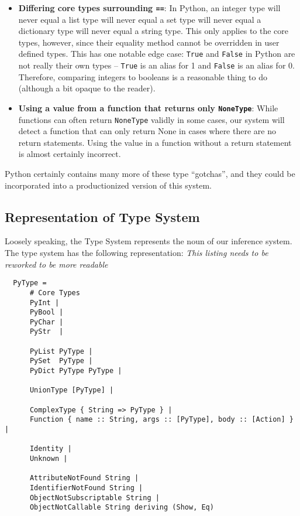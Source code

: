 \documentclass{article}[12pt]
\begin{document}
\begin{itemize}
    \item \textbf{Differing core types surrounding \texttt{==}}: In Python, an integer type will never
          equal a list type will never equal a set type will never equal a dictionary type will
          never equal a string type. This only applies to the core types, however, since their
          equality method cannot be overridden in user defined types. This has one notable edge case: \texttt{True} and
          \texttt{False} in
          Python are not really their own types -- \texttt{True} is an alias for 1 and
          \texttt{False} is an alias for 0. Therefore, comparing integers to booleans is a
          reasonable thing to do (although a bit opaque to the reader).

      \item \textbf{Using a value from a function that returns only \texttt{NoneType}}: While functions can often
          return \texttt{NoneType} validly in some cases, our system will detect a function that can only
          return None in cases where there are no return statements. Using the value in a function
          without a return statement is almost certainly incorrect.
\end{itemize}

Python certainly contains many more of these type ``gotchas'', and they could be incorporated into a
productionized version of this system.

\subsection{Representation of Type System} 

Loosely speaking, the Type System represents the noun of our inference system. The type system has
the following representation:
\emph{This listing needs to be reworked to be more readable}
 \begin{verbatim} 
  PyType = 
      # Core Types
      PyInt | 
      PyBool | 
      PyChar |
      PyStr  |

      PyList PyType | 
      PySet  PyType |
      PyDict PyType PyType | 

      UnionType [PyType] | 

      ComplexType { String => PyType } | 
      Function { name :: String, args :: [PyType], body :: [Action] } | 

      Identity |
      Unknown |

      AttributeNotFound String |
      IdentifierNotFound String |
      ObjectNotSubscriptable String |
      ObjectNotCallable String deriving (Show, Eq) 
\end{verbatim}
\end{document}
